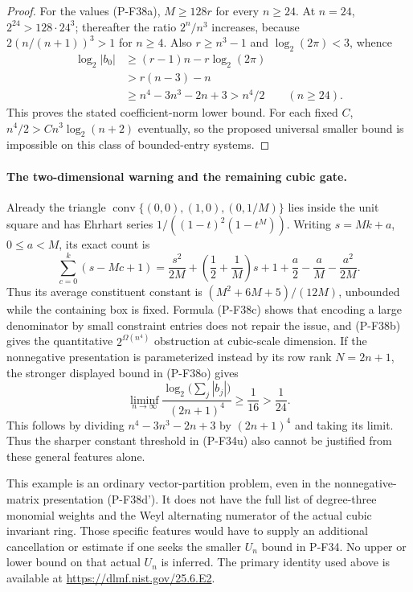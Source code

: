\documentclass[11pt,a4paper]{article}
\begin{document}
\begin{proof}
For the values (P-F38a), $M\ge128r$ for every $n\ge24$.
At $n=24$, $2^{24}>128\cdot24^3$; thereafter the ratio
$2^n/n^3$ increases, because
$2(n/(n+1))^3>1$ for $n\ge4$.
Also $r\ge n^3-1$ and $\log_2(2\pi)<3$, whence
\[
 \begin{split}
 \log_2|b_0|
 &\ge (r-1)n-r\log_2(2\pi)\\
 &>r(n-3)-n\\
 &\ge n^4-3n^3-2n+3
 >n^4/2\qquad(n\ge24).
 \end{split}
 \tag{P-F38o}
\]
This proves the stated coefficient-norm lower bound.
For each fixed $C$, $n^4/2>Cn^3\log_2(n+2)$ eventually,
so the proposed universal smaller bound is impossible
on this class of bounded-entry systems.
\end{proof}

\paragraph{The two-dimensional warning and the remaining cubic gate.}
Already the triangle
$\operatorname{conv}\{(0,0),(1,0),(0,1/M)\}$ lies inside
the unit square and has Ehrhart series
$1/((1-t)^2(1-t^M))$. Writing $s=Mk+a$, $0\le a<M$,
its exact count is
\[
 \sum_{c=0}^{k}(s-Mc+1)
   =\frac{s^2}{2M}+
       \left(\frac12+\frac1M\right)s+
       1+\frac a2-\frac aM-\frac{a^2}{2M}.
 \tag{P-F38p}
\]
Thus its average constituent constant is
$(M^2+6M+5)/(12M)$, unbounded while the containing box
is fixed. Formula (P-F38c) shows that encoding a large
denominator by small constraint entries does not repair
the issue, and (P-F38b) gives the quantitative
$2^{\Omega(n^4)}$ obstruction at cubic-scale dimension.
If the nonnegative presentation is parameterized instead by
its row rank $N=2n+1$, the stronger displayed bound in
(P-F38o) gives
\[
 \liminf_{n\to\infty}
   \frac{\log_2\bigl(\sum_j|b_j|\bigr)}{(2n+1)^4}
       \ge\frac1{16}>\frac1{24}.
 \tag{P-F38q}
\]
This follows by dividing $n^4-3n^3-2n+3$ by $(2n+1)^4$
and taking its limit. Thus the sharper constant threshold
in (P-F34u) also cannot be justified from these general
features alone.

This example is an ordinary vector-partition problem,
even in the nonnegative-matrix presentation (P-F38d').
It does not have the full list of degree-three
monomial weights and the Weyl alternating numerator
of the actual cubic invariant ring. Those specific
features would have to supply an additional cancellation
or estimate if one seeks the smaller $U_n$ bound in P-F34.
No upper or lower bound on that actual $U_n$ is inferred.
The primary identity used above is available at
\url{https://dlmf.nist.gov/25.6.E2}.
\end{document}

